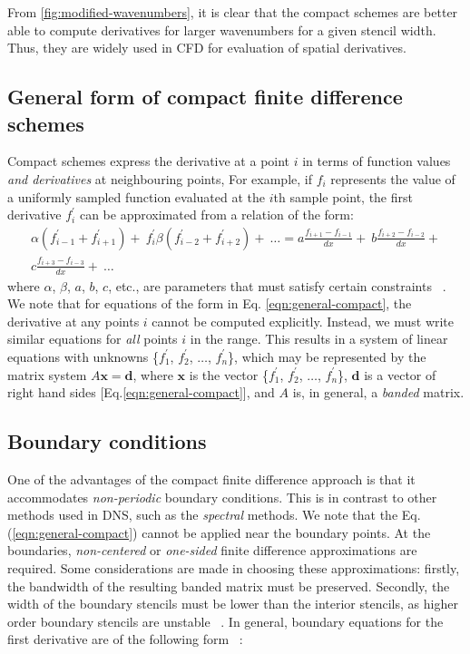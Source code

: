 From \ref{fig:modified-wavenumbers},
it is clear that the compact schemes are better
able to compute derivatives for larger wavenumbers
for a given stencil width.
Thus, they are widely used in
CFD for evaluation of spatial derivatives.

\subsection{General form of compact finite difference schemes}
\label{subsec:gen-form-compact}

Compact schemes express the derivative at a point $i$
in terms of
function values \emph{and derivatives}
at neighbouring points,
For example,
if $f_i$ represents the value of
a uniformly sampled function evaluated at the $i$th sample point,
the first derivative $f^{\prime}_i$ can be approximated from
a relation of the form:
%
\begin{equation}
\begin{split}
    \alpha(f^{\prime}_{i-1} + f^{\prime}_{i+1}) + \
        f^{\prime}_i
    \beta(f^{\prime}_{i-2} + f^{\prime}_{i+2}) + \
    \hdots
    = 
    a\frac{f_{i+1} - f_{i-1}}{dx} + \
    b\frac{f_{i+2} - f_{i-2}}{dx} + \\
    c\frac{f_{i+3} - f_{i-3}}{dx} + \
    \hdots
\end{split}
\label{eqn:general-compact}
\end{equation}
%
where $\alpha$, $\beta$, $a$, $b$, $c$, etc.,
are parameters that must satisfy certain constraints ~\cite{lele1992compact}.
We note that for equations of the form in Eq. \ref{eqn:general-compact},
the derivative at any points $i$ cannot be computed explicitly.
Instead, we must write similar equations for \emph{all} points $i$
in the range.
This results in a system of linear equations
with unknowns \{$f^{\prime}_1$, $f^{\prime}_2$, $\hdots$, $f^{\prime}_n$\},
which may be represented by the matrix system $A\bm{x}=\bm{d}$,
where $\bm{x}$ is the vector
\{$f^{\prime}_1$, $f^{\prime}_2$, $\hdots$, $f^{\prime}_n$\},
$\bm{d}$ is a vector of right hand sides [Eq.\ref{eqn:general-compact}],
and $A$ is, in general, a \emph{banded} matrix.

\subsection{Boundary conditions}

One of the advantages of the compact finite difference approach
is that it accommodates \emph{non-periodic} boundary conditions.
This is in contrast to other methods used in DNS,
such as the \emph{spectral} methods.
We note that the Eq. (\ref{eqn:general-compact})
cannot be applied near the boundary points.
At the boundaries,
\emph{non-centered} or \emph{one-sided}
finite difference approximations are required.
Some considerations are made in choosing
these approximations:
firstly, the bandwidth of the resulting banded matrix
must be preserved.
Secondly,
the width of the boundary stencils
must be lower than the interior stencils,
as higher order boundary stencils are unstable
~\cite{kennedy1994several}.
In general, boundary equations for the first derivative
are of the following form ~\cite{lele1992compact}:

